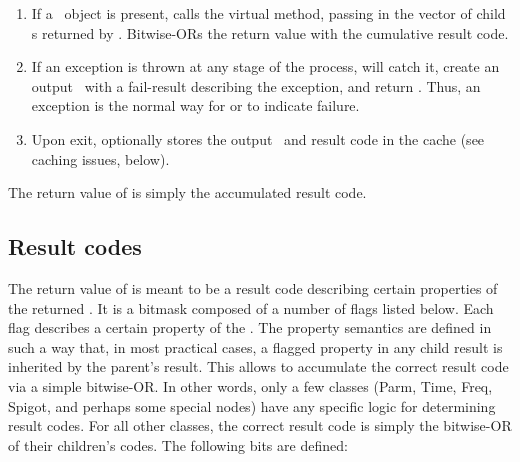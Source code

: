 \documentclass[10pt]{article}
\begin{document}
\begin{enumerate}
  \item If a \Cells\ object is present, calls the virtual 
    method, passing in the vector of child \Result{}s returned by
    . Bitwise-ORs the return value with the cumulative
    result code.

  \item If an exception is thrown at any stage of the process, 
    will catch it, create an output \Result\ with a fail-result describing the
    exception, and return . Thus, an exception is the normal way for
     or  to indicate failure.
    
  \item Upon exit, optionally stores the output \Result\ and result code in the
    cache (see caching issues, below).

  \end{enumerate}

  The return value of  is simply the accumulated result code.
  
\subsection{Result codes}

  The return value of  is meant to be a result code describing
  certain properties  of the returned \Result. It is a bitmask composed of a
  number of flags listed below. Each flag describes a certain property of the
  \Result. The property semantics are defined in such a way that, in most
  practical cases, a flagged property in any child result is inherited by the
  parent's result. This allows  to accumulate the correct result
  code via a simple bitwise-OR. In other words, only a few classes (Parm, Time,
  Freq, Spigot, and perhaps some special nodes) have any specific logic for
  determining result codes. For all other classes, the correct result code is
  simply the bitwise-OR of their children's codes. The following bits are
  defined:
  
\end{document}
